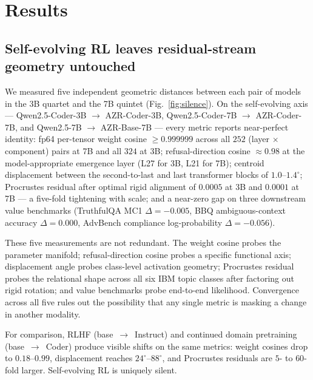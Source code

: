 \documentclass[11pt,a4paper]{article}
\begin{document}
\section{Results}

\subsection{Self-evolving RL leaves residual-stream geometry untouched}
\label{sec:silence}

We measured five independent geometric distances between each pair of
models in the 3B quartet and the 7B quintet (Fig.~\ref{fig:silence}).
On the self-evolving axis — Qwen2.5-Coder-3B $\to$ AZR-Coder-3B,
Qwen2.5-Coder-7B $\to$ AZR-Coder-7B, and Qwen2.5-7B $\to$ AZR-Base-7B —
every metric reports near-perfect identity: fp64 per-tensor weight cosine
$\geq 0.999999$ across all $252$ (layer $\times$ component) pairs at 7B
and all $324$ at 3B; refusal-direction cosine $\approx 0.98$ at the
model-appropriate emergence layer (L27 for 3B, L21 for 7B); centroid
displacement between the second-to-last and last transformer blocks of
$1.0$--$1.4^{\circ}$; Procrustes residual after optimal rigid alignment
of $0.0005$ at 3B and $0.0001$ at 7B — a five-fold tightening with
scale; and a near-zero gap on three downstream value benchmarks
(TruthfulQA MC1 $\Delta = -0.005$, BBQ ambiguous-context accuracy
$\Delta = 0.000$, AdvBench compliance log-probability
$\Delta = -0.056$).

These five measurements are not redundant. The weight cosine probes the
parameter manifold; refusal-direction cosine probes a specific functional
axis; displacement angle probes class-level activation geometry;
Procrustes residual probes the relational shape across all six IBM topic
classes after factoring out rigid rotation; and value benchmarks probe
end-to-end likelihood. Convergence across all five rules out the
possibility that any single metric is masking a change in another modality.

For comparison, RLHF (base~$\to$~Instruct) and continued domain
pretraining (base~$\to$~Coder) produce visible shifts on the same metrics:
weight cosines drop to $0.18$--$0.99$, displacement reaches
$24^{\circ}$--$88^{\circ}$, and Procrustes residuals are $5$- to $60$-fold
larger. Self-evolving RL is uniquely silent.
\end{document}
